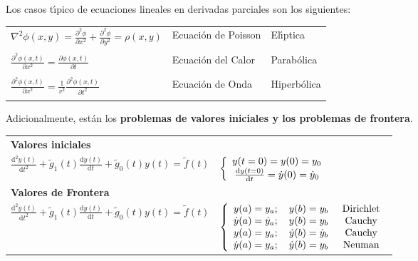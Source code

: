 \documentclass[spanish,titlepage,11pt]{article}
\begin{document}
\newline Los casos t\'{\i}pico de ecuaciones lineales en derivadas parciales
son los si\-guien\-tes:\newline
\begin{tabular}
[c]{lll}%
$\nabla^{2}\phi\left(  x,y\right)  =\frac{\partial^{2}\phi}{\partial x^{2}%
}+\frac{\partial^{2}\phi}{\partial y^{2}}=\rho\left(  x,y\right)  $ &
Ecuaci\'{o}n de Poisson & \textsf{El\'{\i}ptica}\\
&  & \\
$\frac{\partial^{2}\phi\left(  x,t\right)  }{\partial x^{2}}=\frac
{\partial\phi\left(  x,t\right)  }{\partial t}$ & Ecuaci\'{o}n del Calor &
\textsf{Parab\'{o}lica}\\
&  & \\
$\frac{\partial^{2}\phi\left(  x,t\right)  }{\partial x^{2}}=\frac{1}{v^{2}%
}\frac{\partial^{2}\phi\left(  x,t\right)  }{\partial t^{2}}$ & Ecuaci\'{o}n
de Onda & \textsf{Hiperb\'{o}lica}\\
&  &
\end{tabular}

Adicionalmente, est\'{a}n los \textbf{problemas de valores iniciales y los
pro\-ble\-mas de frontera}.\newline
\begin{tabular}
[c]{ll}%
\textbf{Valores iniciales} & \\
$\frac{\mathrm{d}^{2}y(t)}{\mathrm{d}t^{2}}+\tilde{g}_{1}(t)\frac
{\mathrm{d}y(t)}{\mathrm{d}t}+\tilde{g}_{0}(t)y(t)=\tilde{f}(t)$ & $\left\{
\begin{array}
[c]{c}%
y(t=0)=y(0)=y_{0}\\
\frac{\mathrm{d}y(t=0)}{\mathrm{d}t}=\dot{y}(0)=\dot{y}_{0}%
\end{array}
\right.  $\\
\textbf{Valores de Frontera} & \\
$\frac{\mathrm{d}^{2}y(t)}{\mathrm{d}t^{2}}+\tilde{g}_{1}(t)\frac
{\mathrm{d}y(t)}{\mathrm{d}t}+\tilde{g}_{0}(t)y(t)=\tilde{f}(t)$ & $\left\{
\begin{array}
[c]{c}%
y(a)=y_{a};\quad y(b)=y_{b}\\
\dot{y}(a)=\dot{y}_{a};\quad y(b)=y_{b}\\
y(a)=y_{a};\quad\dot{y}(b)=\dot{y}_{b}\\
\dot{y}(a)=y_{a};\quad\dot{y}(b)=y_{b}%
\end{array}
\right.  \left.
\begin{array}
[c]{c}%
\text{Dirichlet}\\
\text{Cauchy}\\
\text{Cauchy}\\
\text{Neuman}%
\end{array}
\right.  $%
\end{tabular}
\end{document}
